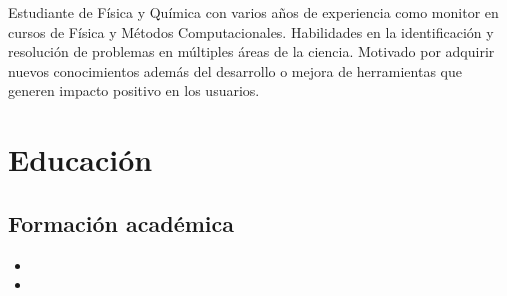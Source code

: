 \documentclass[11pt, letterpaper, sans]{moderncv}        %
\begin{document}
\makecvtitle

\small{Estudiante de Física y Química con varios años de experiencia como monitor en cursos de Física y Métodos Computacionales. Habilidades en la identificación y resolución de problemas en múltiples áreas de la ciencia. Motivado por adquirir nuevos conocimientos además del desarrollo o mejora de herramientas que generen impacto positivo en los usuarios.}


\section{Educación}

\vspace{5pt}

\subsection{Formación académica}

\vspace{5pt}

\begin{itemize}

\item{}
\item{}

\end{itemize}

\vspace{2pt}





\end{document}
